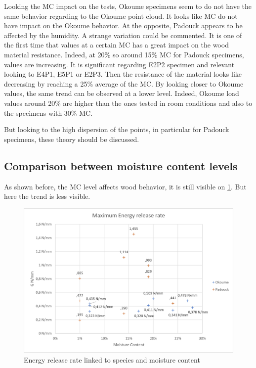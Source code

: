 Looking the MC impact on the tests, Okoume specimens seem to do not have the same behavior regarding to the Okoume point cloud. It looks like MC do not have impact on the Okoume behavior. At the opposite, Padouck appears to be affected by the humidity. A strange variation could be commented. It is one of the first time that values at a certain MC has a great impact on the wood material resistance. Indeed, at 20\% so around 15\% MC for Padouck specimens, values are increasing. It is significant regarding E2P2 specimen and relevant looking to E4P1, E5P1 or E2P3. Then the resistance of the material looks like decreasing by reaching a 25\% average of the MC. By looking closer to Okoume values, the same trend can be observed at a lower level. Indeed, Okoume load values around 20\% are higher than the ones tested in room conditions and also to the specimens with 30\% MC.

But looking to the high dispersion of the points, in particular for Padouck specimens, these theory should be discussed.

\subsection{Comparison between moisture content levels}

As shown before, the MC level affects wood behavior, it is still visible on \ref{fig:G_MC_species}. But here the trend is less visible.
\begin{figure}[th]
	\centering
	\includegraphics[width=\textwidth]{Figures/G_MC_species}
	\decoRule
	\caption[Energy release rate linked to species and moisture content]{Energy release rate linked to species and moisture content}
	\label{fig:G_MC_species}
\end{figure}

